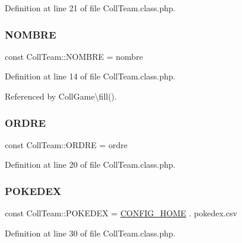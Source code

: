 Definition at line 21 of file Coll\+Team.\+class.\+php.

\mbox{\label{class_coll_team_af7143bb7420640b79e58143fd31ba9fe}} 
\subsubsection{\texorpdfstring{N\+O\+M\+B\+RE}{NOMBRE}}
{\footnotesize\ttfamily const Coll\+Team\+::\+N\+O\+M\+B\+RE = \textquotesingle{}nombre\textquotesingle{}}



Definition at line 14 of file Coll\+Team.\+class.\+php.



Referenced by Coll\+Game\textbackslash{}fill().

\mbox{\label{class_coll_team_aa9e4c2a83ebfe02c04412f00b13e7f82}} 
\subsubsection{\texorpdfstring{O\+R\+D\+RE}{ORDRE}}
{\footnotesize\ttfamily const Coll\+Team\+::\+O\+R\+D\+RE = \textquotesingle{}ordre\textquotesingle{}}



Definition at line 20 of file Coll\+Team.\+class.\+php.

\mbox{\label{class_coll_team_a2c56adbfdb1008442228323f3a87ab7c}} 
\subsubsection{\texorpdfstring{P\+O\+K\+E\+D\+EX}{POKEDEX}}
{\footnotesize\ttfamily const Coll\+Team\+::\+P\+O\+K\+E\+D\+EX = \hyperlink{application_2src_2define_8php_aa32003175807358a35405b1e01132669}{C\+O\+N\+F\+I\+G\+\_\+\+H\+O\+ME} . \textquotesingle{}pokedex.\+csv\textquotesingle{}}



Definition at line 30 of file Coll\+Team.\+class.\+php.

